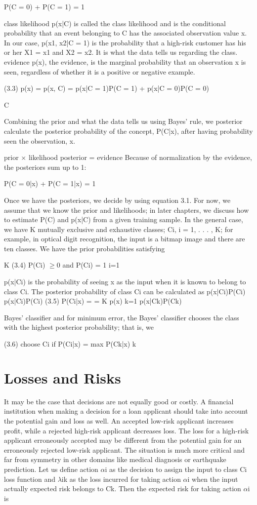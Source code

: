 P(C = 0) + P(C = 1) = 1

class likelihood p(x|C) is called the class likelihood and is the conditional probability that an event belonging to C has the associated observation value x. In our case, p(x1, x2|C = 1) is the probability that a high-risk customer has his or her X1 = x1 and X2 = x2. It is what the data tells us regarding the class. evidence p(x), the evidence, is the marginal probability that an observation x is seen, regardless of whether it is a positive or negative example.

(3.3) p(x) = p(x, C) = p(x|C = 1)P(C = 1) + p(x|C = 0)P(C = 0)

C

Combining the prior and what the data tells us using Bayes’ rule, we posterior calculate the posterior probability of the concept, P(C|x), after having probability seen the observation, x.

prior $\times$ likelihood posterior = evidence Because of normalization by the evidence, the posteriors sum up to 1:

P(C = 0|x) + P(C = 1|x) = 1

Once we have the posteriors, we decide by using equation 3.1. For now, we assume that we know the prior and likelihoods; in later chapters, we discuss how to estimate P(C) and p(x|C) from a given training sample. In the general case, we have K mutually exclusive and exhaustive classes; Ci, i = 1, . . . , K; for example, in optical digit recognition, the input is a bitmap image and there are ten classes. We have the prior probabilities satisfying

K (3.4) P(Ci) $\geq$0 and P(Ci) = 1 i=1

p(x|Ci) is the probability of seeing x as the input when it is known to belong to class Ci. The posterior probability of class Ci can be calculated as p(x|Ci)P(Ci) p(x|Ci)P(Ci) (3.5) P(Ci|x) = = K p(x) k=1 p(x|Ck)P(Ck)

Bayes’ classifier and for minimum error, the Bayes’ classifier chooses the class with the highest posterior probability; that is, we

(3.6) choose Ci if P(Ci|x) = max P(Ck|x) k

\section{Losses and Risks}

It may be the case that decisions are not equally good or costly. A financial institution when making a decision for a loan applicant should take into account the potential gain and loss as well. An accepted low-risk applicant increases profit, while a rejected high-risk applicant decreases loss. The loss for a high-risk applicant erroneously accepted may be different from the potential gain for an erroneously rejected low-risk applicant. The situation is much more critical and far from symmetry in other domains like medical diagnosis or earthquake prediction. Let us define action $\alpha$i as the decision to assign the input to class Ci loss function and $\lambda$ik as the loss incurred for taking action $\alpha$i when the input actually expected risk belongs to Ck. Then the expected risk for taking action $\alpha$i is

